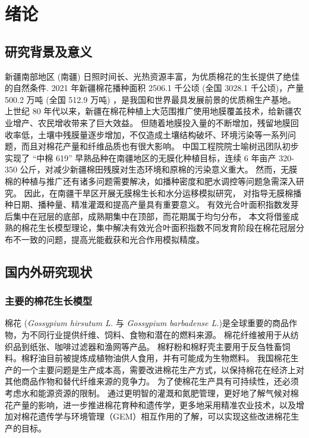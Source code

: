 \chapter{绪论}\label{chap:intro}
\section{研究背景及意义}
新疆南部地区 (南疆) 日照时间长、光热资源丰富，为优质棉花的生长提供了绝佳的自然条件.
2021 年新疆棉花播种面积 2506.1 千公顷 (全国 3028.1 千公顷)，产量 500.2 万吨 (全国 512.9 万吨) \cite{国家统计局关于2021年棉花产量的公告}，是我国和世界最具发展前景的优质棉生产基地。
上世纪 80 年代以来，新疆在棉花种植上大范围推广使用地膜覆盖技术，给新疆农业增产、农民增收带来了巨大效益。
但随着地膜投入量的不断增加，残留地膜回收率低，土壤中残膜量逐步增加，不仅造成土壤结构破坏、环境污染等一系列问题，而且对棉花产量和纤维品质也有很大影响。
中国工程院院士喻树迅团队初步实现了 “中棉 619” 早熟品种在南疆地区的无膜化种植目标，连续 6 年亩产 320{-}350 公斤，对减少新疆棉田残膜对生态环境和原棉的污染意义重大\cite{yu2019}。
然而，无膜棉的种植与推广还有诸多问题需要解决，如播种密度和肥水调控等问题急需深入研究。
因此，在南疆干旱区开展无膜棉生长和水分运移模拟研究，%
对指导无膜棉播种日期、播种量、精准灌溉和提高产量具有重要意义。
有效光合叶面积指数发芽后集中在冠层的底部，成熟期集中在顶部，而花期属于均匀分布，%
本文将借鉴成熟的棉花生长模型理论，集中解决有效光合叶面积指数不同发育阶段在棉花冠层分布不一致的问题，提高光能截获和光合作用模拟精度。

\section{国内外研究现状}
\subsection{主要的棉花生长模型}
棉花 (\textit{Gossypium hirsutum L.} 与 \textit{Gossypium barbadense L.})是全球重要的商品作物，为不同行业提供纤维、饲料、食物和潜在的燃料来源。%
棉花纤维被用于从纺织品到纸张、咖啡过滤器和渔网等产品。%
棉籽粉和棉籽壳主要用于反刍牲畜饲料。棉籽油目前被提炼成植物油供人食用，并有可能成为生物燃料。%
我国棉花生产的一个主要问题是生产成本高，需要改进棉花生产方式，以保持棉花在经济上对其他商品作物和替代纤维来源的竞争力。%
为了使棉花生产具有可持续性，还必须考虑水和能源资源的限制。%
通过更明智的灌溉和氮肥管理，更好地了解气候对棉花产量的影响，进一步推进棉花育种和遗传学，更多地采用精准农业技术，以及增加对棉花遗传学与环境管理（GEM）相互作用的了解，可以实现这些改进棉花生产的目标。


